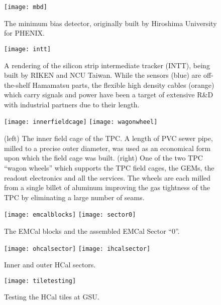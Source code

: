 \begin{figure}[hbt!]
  \centering
  \texttt{[image: mbd]}
  \caption{The minimum bias detector, originally built by Hiroshima
    University for PHENIX.}
  \label{fig:mbd}
\end{figure}

\begin{figure}[hbt!]
  \centering
  \texttt{[image: intt]}
  \caption{A rendering of the silicon strip intermediate tracker
    (INTT), being built by RIKEN and NCU Taiwan.  While the sensors
    (blue) are off-the-shelf Hamamatsu parts, the flexible high
    density cables (orange) which carry signals and power have been a
    target of extensive R\&D with industrial partners due to their
    length.}
  \label{fig:mbd}
\end{figure}

\begin{figure}[hbt!]
  \centering
  \texttt{[image: innerfieldcage]}
  \hfill
  \texttt{[image: wagonwheel]}
  \caption{(left) The inner field cage of the TPC. A length of PVC
    sewer pipe, milled to a precise outer diameter, was used as an
    economical form upon which the field cage was built.  (right) One
    of the two TPC ``wagon wheels'' which supports the TPC field
    cages, the GEMs, the readout electronics and all the services.
    The wheels are each milled from a single billet of aluminum
    improving the gas tightness of the TPC by eliminating a large
    number of seams.}
  \label{fig:wagonwheel}
\end{figure}

\begin{figure}[hbt!]
  \centering
  \texttt{[image: emcalblocks]}
  \hfill
  \texttt{[image: sector0]}
  \caption{The EMCal blocks and the assembled EMCal Sector ``0''.}
  \label{fig:emcal}
\end{figure}

\begin{figure}[hbt!]
  \centering
  \texttt{[image: ohcalsector]}
  \hfill
  \texttt{[image: ihcalsector]}
  \caption{Inner and outer HCal sectors.}
  \label{fig:hcal}
\end{figure}

\begin{figure}[hbt!]
  \centering
  \texttt{[image: tiletesting]}
  \caption{Testing the HCal tiles at GSU.}
  \label{fig:tiletesting}
\end{figure}




